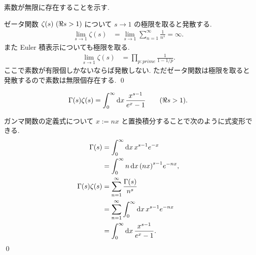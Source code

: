 \documentclass[uplatex,dvipdfmx,a4paper,11pt]{jlreq}
\makeatletter
\theoremstyle{definition}
\renewenvironment{proof}[1][\proofname]{\par
  \normalfont
  \topsep6\p@\@plus6\p@ \trivlist
  \item[\hskip\labelsep{\bfseries #1}\@addpunct{\bfseries}]\ignorespaces\quad\par
}{%
  \qed\endtrivlist\@endpefalse
}
\renewcommand\proofname{証明}
\makeatother
\begin{document}
\begin{proposition}
  素数が無限に存在することを示す.
\end{proposition}
\begin{proof}
  ゼータ関数 $\zeta(s)\ (\real s > 1)$ について $s\to 1$ の極限を取ると発散する.
  \begin{align}
    \lim_{s\to 1}\zeta(s) & = \lim_{s\to 1}\sum_{n=1}^{\infty}\frac{1}{n^s} = \infty.
  \end{align}
  また Euler 積表示についても極限を取る.
  \begin{align}
    \lim_{s\to 1}\zeta(s) & = \prod_{p:prime}\frac{1}{1 - 1/p}.
  \end{align}
  ここで素数が有限個しかないならば発散しない. ただゼータ関数は極限を取ると発散するので素数は無限個存在する.
\end{proof}

\begin{proposition}
  \begin{align}
    \Gamma(s)\zeta(s) = \int_0^\infty\dd{x}\frac{x^{s-1}}{e^x - 1} \qquad (\real s > 1).
  \end{align}
\end{proposition}
\begin{proof}
  ガンマ関数の定義式について $x := nx$ と置換積分することで次のように式変形できる.
  \begin{align}
    \Gamma(s)         & = \int_0^\infty \dd{x}x^{s-1}e^{-x}                     \\
                      & = \int_0^\infty n\dd{x}\qty(nx)^{s-1}e^{-nx},           \\
    \Gamma(s)\zeta(s) & = \sum_{n=1}^{\infty}\frac{\Gamma(s)}{n^s}              \\
                      & = \sum_{n=1}^{\infty}\int_0^\infty \dd{x}x^{s-1}e^{-nx} \\
                      & = \int_0^\infty\dd{x}\frac{x^{s-1}}{e^x - 1}.
  \end{align}
\end{proof}
\end{document}
